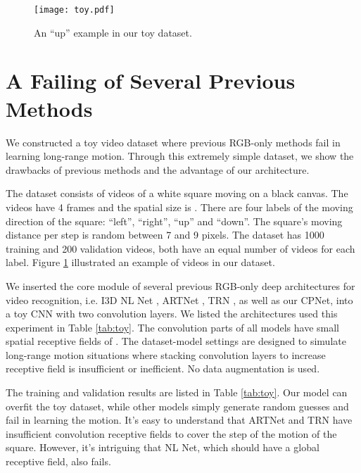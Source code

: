 \documentclass[10pt,twocolumn,letterpaper]{article}
\begin{document}
\begin{figure}[t]
\captionsetup{position=bottom}
\centering
\texttt{[image: toy.pdf]}
\vspace{-2ex}
\caption{An ``up'' example in our toy dataset.} 
\label{fig:toy:viz}
\vspace{-1ex}
\end{figure}






\section{A Failing of Several Previous Methods}


We constructed a toy video dataset where previous RGB-only methods fail in learning long-range motion. Through this extremely simple dataset, we show the drawbacks of previous methods and the advantage of our architecture.


The dataset consists of videos of a  white square moving on a black canvas. The videos have 4 frames and the spatial size is . There are four labels of the moving direction of the square: ``left'', ``right'', ``up'' and ``down''. The square's moving distance per step is random between 7 and 9 pixels. The dataset has 1000 training and 200 validation videos, both have an equal number of videos for each label. Figure \ref{fig:toy:viz} illustrated an example of videos in our dataset.

We inserted the core module of several previous RGB-only deep architectures for video recognition, i.e. I3D NL Net \cite{NLNet}, ARTNet \cite{ARTNet}, TRN \cite{TRN}, as well as our CPNet, into a toy CNN with two  convolution layers. We listed the architectures used this experiment in Table \ref{tab:toy}. The convolution parts of all models have small spatial receptive fields of . The dataset-model settings are designed to simulate long-range motion situations where stacking convolution layers to increase receptive field is insufficient or inefficient.
No data augmentation is used. 

The training and validation results are listed in Table \ref{tab:toy}. Our model can overfit the toy dataset, while other models simply generate random guesses and fail in learning the motion.
It's easy to understand that ARTNet and TRN have insufficient convolution receptive fields to cover the step of the motion of the square. However, it's intriguing that NL Net, which should have a global receptive field, also fails. 
\end{document}
